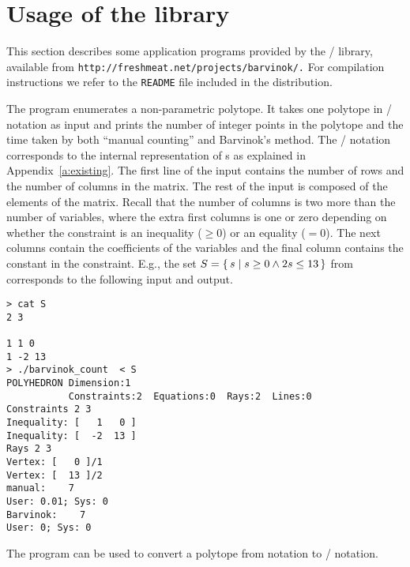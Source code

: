 \section{\texorpdfstring{Usage of the \protect{} library}
{Usage of the barvinok library}}
\label{a:usage}

{\sloppy 
This section describes some application programs
provided by the \barvinok/ library,
available from {\tt http://freshmeat.net/projects/barvinok/.}
For compilation instructions we refer to the \verb+README+ file
included in the distribution.
}

The program  enumerates a
non-parametric polytope.  It takes one polytope
in \PolyLib/ notation as input and prints the number
of integer points in the polytope and the time taken
by both ``manual counting'' and Barvinok's method.
The \PolyLib/ notation corresponds to the internal
representation of s as explained
in Appendix~\ref{a:existing}.
The first line of the input contains the number of rows
and the number of columns in the  matrix.
The rest of the input is composed of the elements of the matrix.
Recall that the number of columns is two more than the number
of variables, where the extra first columns is one or zero
depending on whether the constraint is an inequality ($\ge 0$)
or an equality ($= 0$).  The next columns contain
the coefficients of the variables and the final column contains
the constant in the constraint.
E.g., the set 
$S = \left\{\, s \mid s \geq 0 \wedge  2 s \leq 13 \, \right\}$
from 
corresponds to the following input and
output.
\begin{verbatim}
> cat S
2 3

1 1 0
1 -2 13
> ./barvinok_count  < S
POLYHEDRON Dimension:1
           Constraints:2  Equations:0  Rays:2  Lines:0
Constraints 2 3
Inequality: [   1   0 ]
Inequality: [  -2  13 ]
Rays 2 3
Vertex: [   0 ]/1
Vertex: [  13 ]/2
manual:    7
User: 0.01; Sys: 0
Barvinok:    7
User: 0; Sys: 0
\end{verbatim}
The program  can be used to
convert a polytope from  
notation to \PolyLib/ notation.

